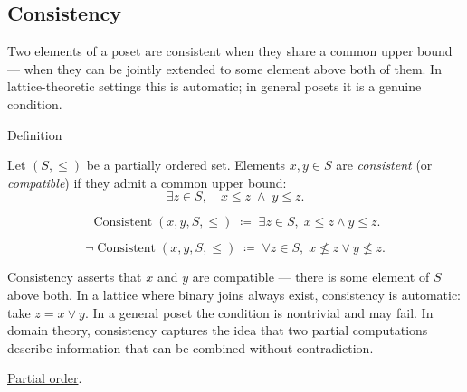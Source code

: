 
\subsection{Consistency}
\label{sec:consistency}

\begin{remark*}
Two elements of a poset are consistent when they share a common upper
bound --- when they can be jointly extended to some element above both of
them.  In lattice-theoretic settings this is automatic; in general posets
it is a genuine condition.
\end{remark*}


\begin{definitionbox}{Definition}
\begin{definition}[Consistency]
\label{def:consistency}
Let $(S, \leq)$ be a partially ordered set.  Elements $x, y \in S$ are
\emph{consistent} (or \emph{compatible}) if they admit a common upper
bound:
\[
\exists z \in S, \quad x \leq z \;\land\; y \leq z.
\]
\end{definition}
\end{definitionbox}

\begin{remark*}
\[
\operatorname{Consistent}(x, y, S, \leq)
\;\coloneqq\;
\exists z \in S,\; x \leq z \land y \leq z.
\]
\end{remark*}

\begin{remark*}
\[
\neg\operatorname{Consistent}(x, y, S, \leq)
\;\coloneqq\;
\forall z \in S,\; x \not\leq z \lor y \not\leq z.
\]
\end{remark*}

\begin{remark*}[Interpretation]
Consistency asserts that $x$ and $y$ are compatible --- there is some
element of $S$ above both.  In a lattice where binary joins always exist,
consistency is automatic: take $z = x \vee y$.  In a general poset the
condition is nontrivial and may fail.  In domain theory, consistency
captures the idea that two partial computations describe information that
can be combined without contradiction.
\end{remark*}

\begin{dependencies}
\hyperref[def:lattice-order-partial-order]{Partial order}.
\end{dependencies}
